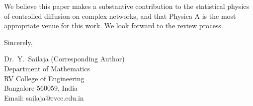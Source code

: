 \documentclass[12pt,a4paper]{article}
\begin{document}
\medskip

We believe this paper makes a substantive contribution to the statistical
physics of controlled diffusion on complex networks, and that Physica A is
the most appropriate venue for this work.  We look forward to the review
process.

\bigskip

\noindent Sincerely,

\bigskip\bigskip

\noindent Dr.\ Y.\ Sailaja (Corresponding Author)\\
Department of Mathematics\\
RV College of Engineering\\
Bangalore 560059, India\\
Email: sailaja@rvce.edu.in
\end{document}
